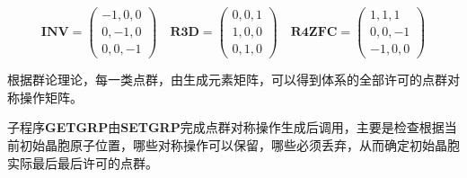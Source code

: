\begin{itemize}
\begin{displaymath}
	\mathbf{INV}=
	\begin{pmatrix}
		-1, 0, 0 \\ 
		0,-1, 0 \\
		0, 0, -1
	\end{pmatrix}\quad
	\mathbf{R3D}=
	\begin{pmatrix}
		0, 0, 1 \\ 
		1, 0, 0 \\
		0, 1, 0
	\end{pmatrix}\quad
	\mathbf{R4ZFC}=
	\begin{pmatrix}
		1, 1, 1 \\ 
		0, 0, -1 \\
		-1, 0, 0
	\end{pmatrix}
\end{displaymath}
\end{itemize}
根据群论理论，每一类点群，由生成元素矩阵，可以得到体系的全部许可的点群对称操作矩阵。

子程序\textbf{GETGRP}由\textbf{SETGRP}完成点群对称操作生成后调用，主要是检查根据当前初始晶胞原子位置，哪些对称操作可以保留，哪些必须丢弃，从而确定初始晶胞实际最后最后许可的点群。
